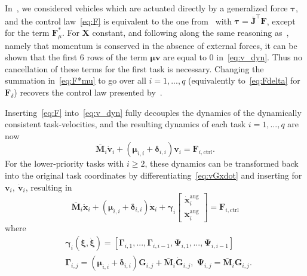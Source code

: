 \documentclass[../main.tex]{subfiles}
\begin{document}
In~\cite{Saeboe2022}, we considered vehicles which are actuated directly by a generalized force $\bm{\tau}$, and the control law~\eqref{eq:F} is equivalent to the one from~\cite{Saeboe2022} with $\bm{\tau} = \bar{\bm{J}}^\top \bm{F}$, except for the term $\bm{F}^*_{\mu}$. For $\bm{X}$ constant, and following along the same reasoning as~\cite{Garofalo2015}, namely that momentum is conserved in the absence of external forces, it can be shown that the first 6 rows of the term $\bm{\mu} \bm{v}$ are equal to 0 in~\eqref{eq:v_dyn}. Thus no cancellation of these terms for the first task is necessary. Changing the summation in~\eqref{eq:F*mu} to go over all $i=1,...,q$ (equivalently to~\eqref{eq:Fdelta} for $\bm{F}_\delta$) recovers the control law presented by~\cite{Saeboe2022}.



Inserting~\eqref{eq:F} into~\eqref{eq:v_dyn} fully decouples the dynamics of the dynamically consistent task-velocities, and the resulting dynamics of each task $i=1,...,q$ are now
\begin{equation}
    \bar{\bm{M}}_i \dot{\bm{v}}_i + \left( \bm{\mu}_{i,i} + \bm{\delta}_{i,i} \right) \bm{v}_i = \bm{F}_{i,\textrm{ctrl}} .
\end{equation}
For the lower-priority tasks with $i \geq 2$, these dynamics can be transformed back into the original task coordinates by differentiating~\eqref{eq:vGxdot} and inserting for $\bm{v}_i,\ \dot{\bm{v}}_i$, resulting in
\begin{equation}\label{eq:x_i_ddot}
    \bar{\bm{M}}_i \ddot{\bm{x}}_i + \left( \bm{\mu}_{i,i} + \bm{\delta}_{i,i} \right) \dot{\bm{x}}_i + \bm{\gamma}_i \begin{bmatrix}
        \dot{\bm{x}}^{\textrm{aug}}_i \\ \ddot{\bm{x}}^{\textrm{aug}}_i
    \end{bmatrix} = \bm{F}_{i,\textrm{ctrl}}
\end{equation}
where
\begin{subequations}
    \begin{align}
         &\bm{\gamma}_i (\bm{\xi},\dot{\bm{\xi}}) = \left[\bm{\Gamma}_{i,1},...,\bm{\Gamma}_{i,i-1}, \bm{\Psi}_{i,1},...,\bm{\Psi}_{i,i-1}  \right]\\
        &\bm{\Gamma}_{i,j} = \left( \bm{\mu}_{i,i} + \bm{\delta}_{i,i} \right) \bm{G}_{i,j} + \bar{\bm{M}}_i \dot{\bm{G}}_{i,j}, \; \bm{\Psi}_{i,j} = \bar{\bm{M}}_i \bm{G}_{i,j}.\!
    \end{align}
\end{subequations}
\end{document}
